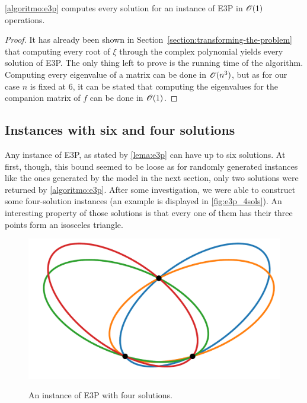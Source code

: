 \begin{teorema}\label{th:e3p}
	\autoref{algoritmo:e3p} computes every solution for an instance of E3P in $\mathscr{O}(1)$ operations.
\end{teorema}

\begin{proof}
	It has already been shown in Section~\ref{section:transforming-the-problem} that computing every root of $\xi$ through the complex polynomial yields every solution of E3P. The only thing left to prove is the running time of the algorithm.
	Computing every eigenvalue of a matrix can be done in $\mathscr{O}(n^3)$, but as for our case $n$ is fixed at $6$, it can be stated that computing the eigenvalues for the companion matrix of $f$ can be done in $\mathscr{O}(1)$.
\end{proof}

\subsection{Instances with six and four solutions}

Any instance of E3P, as stated by \autoref{lema:e3p} can have up to six solutions. At first, though, this bound seemed to be loose as for randomly generated instances like the ones generated by the model in the next section, only two solutions were returned by \autoref{algoritmo:e3p}.
After some investigation, we were able to construct some four-solution instances (an example is displayed in \autoref{fig:e3p_4sols}). An interesting property of those solutions is that every one of them has their three points form an isosceles triangle.

\begin{figure}[H]
	\centering
	\caption{An instance of E3P with four solutions.}
	\includegraphics[scale=.33]{tex/figures/e3p_4sols}
	\fautor
	\label{fig:e3p_4sols}
\end{figure}

